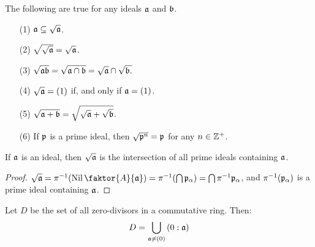 \begin{lemma}\label{lemma_5.5.15}
  The following are true for any ideals $\af$ and  $\bf$.
  \begin{enumerate}
    \item[(1)] $\af \subseteq \sqrt{\af}$.

    \item[(2)] $\sqrt{\sqrt{\af}}=\sqrt{\af}$.

    \item[(3)] $\sqrt{\af\bf}=\sqrt{\af \cap \bf}=\sqrt{\af} \cap \sqrt{\bf.}$

    \item[(4)] $\sqrt{\af}=(1)$ if, and only if $\af=(1)$.

    \item[(5)] $\sqrt{\af+\bf}=\sqrt{\sqrt{\af}+\sqrt{\bf}}$.

    \item[(6)] If $\pf$ is a prime ideal, then $\sqrt{\pf^n}=\pf$ for any $n \in
      \Z^+$.
  \end{enumerate}
\end{lemma}

\begin{lemma}\label{lemma_5.5.16}
  If $\af$ is an ideal, then $\sqrt{\af}$ is the intersection of all prime
  ideals containing $\af$.
\end{lemma}
\begin{proof}
  $\sqrt{\af}=\inv{\pi}(\Nil{\faktor{A}{\af}})=\inv{\pi}(\bigcap{\pf_\a})=
  \bigcap{\inv{\pi}\pf_\a}$, and  $\inv{\pi}(\pf_\a)$ is a prime ideal
  containing $\af$.
\end{proof}

\begin{lemma}\label{lemma_5.5.17}
  Let $D$ be the set of all zero-divisors in a commutative ring. Then:
  \begin{equation}
    D=\bigcup_{\af \neq (0)}{(0:\af)}
  \end{equation}
\end{lemma}

